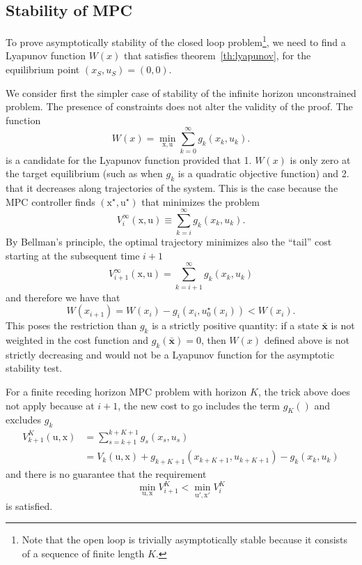 \documentclass[11pt]{report}
\newcommand{\bs}[1]{\boldsymbol{#1}}
\newcommand{\bsu}{\bs{\mathrm{u}}}
\newcommand{\bsx}{\bs{\mathrm{x}}}
\begin{document}
\subsection{Stability of MPC}
\label{sec:stability-MPC}

To prove asymptotically stability of the closed loop problem\footnote{Note that the open loop is trivially asymptotically stable because it consists of a sequence of finite length $K$.}, we need to find a Lyapunov function $W(x)$ that satisfies theorem~\ref{th:lyapunov}, for the equilibrium point $(x_S,u_S)=(0,0)$.

We consider first the simpler case of stability of the infinite horizon unconstrained problem. The presence of constraints does not alter the validity of the proof. The function
\begin{equation*}
  W(x) = \min_{\bsx,\bsu} \sum_{k=0}^\infty g_k(x_k,u_k).
\end{equation*}
is a candidate for the Lyapunov function provided that 1. $W(x)$ is only zero at the target equilibrium (such as when $g_k$ is a quadratic objective function) and 2. that it decreases along trajectories of the system. This is the case because the MPC controller finds $(\bsx^\star, \bsu^\star)$ that minimizes the problem
\begin{equation*}
  V^\infty_i(\bsx,\bsu) \equiv \sum_{k=i}^\infty g_k(x_k,u_k).
\end{equation*}
By Bellman's principle, the optimal trajectory minimizes also the ``tail'' cost starting at the subsequent time $i+1$
\begin{equation*}
  V_{i+1}^\infty(\bsx,\bsu) = \sum_{k=i+1}^\infty g_k(x_k,u_k)
\end{equation*}
and therefore we have that
\begin{equation*}
  W(x_{i+1}) = W(x_i) - g_i(x_i,u_0^\star(x_i)) < W(x_i).
\end{equation*}
This poses the restriction than $g_k$ is a strictly positive quantity: if a state $\bs{\bar{x}}$ is not weighted in the cost function and $g_k(\bs{\bar{x}})=0$, then $W(x)$ defined above is not strictly decreasing and would not be a Lyapunov function for the asymptotic stability test.

For a finite receding horizon MPC problem with horizon $K$, the trick above does not apply because at $i+1$, the new cost to go includes the term $g_{K}()$ and excludes $g_k$
\begin{align*}
  V^K_{k+1}(\bsu,\bsx) &= \sum_{s=k+1}^{k+K+1}g_s(x_s,u_s) \\
                       &= V_k(\bsu,\bsx) + g_{k+K+1}(x_{k+K+1},u_{k+K+1}) - g_k(x_k,u_k)
\end{align*}
and there is no guarantee that the requirement
\begin{equation*}
  \min_{\bsu,\bsx} V^K_{i+1} < \min_{\bsu',\bsx'} V^K_i
\end{equation*}
is satisfied.
\end{document}
